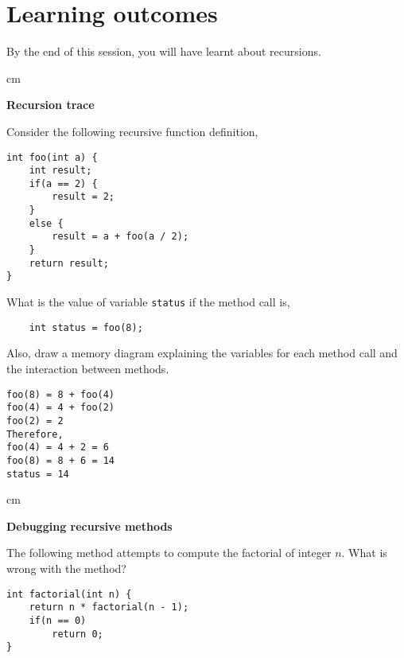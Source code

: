 
\section* {Learning outcomes}

By the end of this session, you will have learnt about recursions. 


\begin{questions}

 cm 

\question  \textbf{Recursion trace} \vskip 0.5cm

Consider the following recursive function definition,

\begin{lstlisting}
int foo(int a) {
	int result;
	if(a == 2) {
		result = 2;
	}
	else {
 		result = a + foo(a / 2);
	}
	return result;
}
\end{lstlisting}

What is the value of variable \texttt{status} if the method call is,

\begin{lstlisting}
	int status = foo(8);
\end{lstlisting}

Also, draw a memory diagram explaining the variables for each method call and the interaction between methods.

\begin{solution}
\begin{verbatim}
foo(8) = 8 + foo(4)
foo(4) = 4 + foo(2)
foo(2) = 2
Therefore,
foo(4) = 4 + 2 = 6
foo(8) = 8 + 6 = 14
status = 14
\end{verbatim}
\end{solution}

 cm 

\question  \textbf{Debugging recursive methods} \vskip 0.5cm

The following method attempts to compute the factorial of integer $n$. What is wrong with the method?

\begin{lstlisting}
int factorial(int n) {
	return n * factorial(n - 1);
	if(n == 0)
		return 0;
}
\end{lstlisting}


\end{questions}
